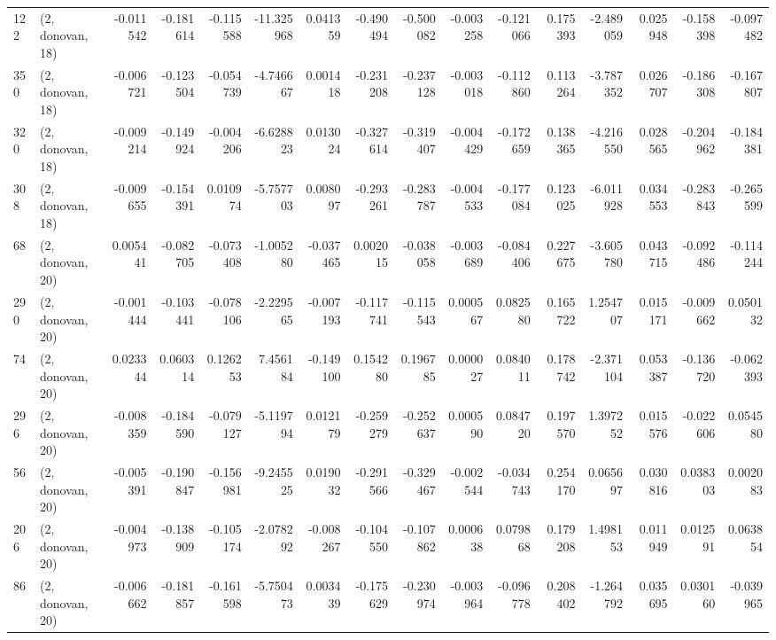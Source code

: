 \begin{tabular}{llrrrrrrrrrrrrrr}
122 &  (2, donovan, 18) &  -0.011542 & -0.181614 & -0.115588 &   -11.325968 &   0.041359 &  -0.490494 &  -0.500082 & -0.003258 & -0.121066 &  0.175393 &   -2.489059 &  0.025948 & -0.158398 & -0.097482 \\
350 &  (2, donovan, 18) &  -0.006721 & -0.123504 & -0.054739 &    -4.746667 &   0.001418 &  -0.231208 &  -0.237128 & -0.003018 & -0.112860 &  0.113264 &   -3.787352 &  0.026707 & -0.186308 & -0.167807 \\
320 &  (2, donovan, 18) &  -0.009214 & -0.149924 & -0.004206 &    -6.628823 &   0.013024 &  -0.327614 &  -0.319407 & -0.004429 & -0.172659 &  0.138365 &   -4.216550 &  0.028565 & -0.204962 & -0.184381 \\
308 &  (2, donovan, 18) &  -0.009655 & -0.154391 &  0.010974 &    -5.757703 &   0.008097 &  -0.293261 &  -0.283787 & -0.004533 & -0.177084 &  0.123025 &   -6.011928 &  0.034553 & -0.283843 & -0.265599 \\
68  &  (2, donovan, 20) &   0.005441 & -0.082705 & -0.073408 &    -1.005280 &  -0.037465 &   0.002015 &  -0.038058 & -0.003689 & -0.084406 &  0.227675 &   -3.605780 &  0.043715 & -0.092486 & -0.114244 \\
290 &  (2, donovan, 20) &  -0.001444 & -0.103441 & -0.078106 &    -2.229565 &  -0.007193 &  -0.117741 &  -0.115543 &  0.000567 &  0.082580 &  0.165722 &    1.254707 &  0.015171 & -0.009662 &  0.050132 \\
74  &  (2, donovan, 20) &   0.023344 &  0.060314 &  0.126253 &     7.456184 &  -0.149100 &   0.154280 &   0.196785 &  0.000027 &  0.084011 &  0.178742 &   -2.371104 &  0.053387 & -0.136720 & -0.062393 \\
296 &  (2, donovan, 20) &  -0.008359 & -0.184590 & -0.079127 &    -5.119794 &   0.012179 &  -0.259279 &  -0.252637 &  0.000590 &  0.084720 &  0.197570 &    1.397252 &  0.015576 & -0.022606 &  0.054580 \\
56  &  (2, donovan, 20) &  -0.005391 & -0.190847 & -0.156981 &    -9.245525 &   0.019032 &  -0.291566 &  -0.329467 & -0.002544 & -0.034743 &  0.254170 &    0.065697 &  0.030816 &  0.038303 &  0.002083 \\
206 &  (2, donovan, 20) &  -0.004973 & -0.138909 & -0.105174 &    -2.078292 &  -0.008267 &  -0.104550 &  -0.107862 &  0.000638 &  0.079868 &  0.179208 &    1.498153 &  0.011949 &  0.012591 &  0.063854 \\
86  &  (2, donovan, 20) &  -0.006662 & -0.181857 & -0.161598 &    -5.750473 &   0.003439 &  -0.175629 &  -0.230974 & -0.003964 & -0.096778 &  0.208402 &   -1.264792 &  0.035695 &  0.030160 & -0.039965 \\

\end{tabular}
